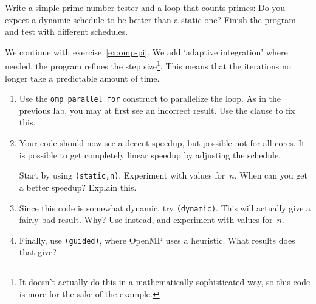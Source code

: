 \begin{exercise}
  Write a simple prime number tester and a loop that counts primes:
  Do you expect a dynamic schedule to be better than a static one?
  Finish the program and test with different schedules.
\end{exercise}

\begin{exercise}
  \label{ex:omp-pi-adapt}
  We continue with exercise~\ref{ex:omp-pi}.
  We add `adaptive integration'%
  where needed, the program refines the step
  size\footnote{It doesn't actually do this in a mathematically
    sophisticated way, so this code is more for the sake of the
    example.}.  This means that the iterations no longer take a
  predictable amount of time.

\begin{enumerate}
\item Use the \lstinline{omp parallel for} construct to parallelize the loop.
  As in the previous lab, you may at first see an incorrect result.
  Use the  clause to fix this.
\item Your code should now see a decent speedup, but possible not for all cores.
  It is possible to get completely linear speedup by adjusting the schedule.

  Start by using \lstinline{(static,n)}.
  Experiment with values for~$n$.
  When can you get a better speedup? Explain this.
\item Since this code is somewhat dynamic, try \lstinline{(dynamic)}.
  This will actually give a fairly bad result. Why?  Use
   instead, and experiment with values
  for~$n$.
\item Finally, use \lstinline{(guided)}, where OpenMP uses a
  heuristic.  What results does that give?
\end{enumerate}
\end{exercise}

